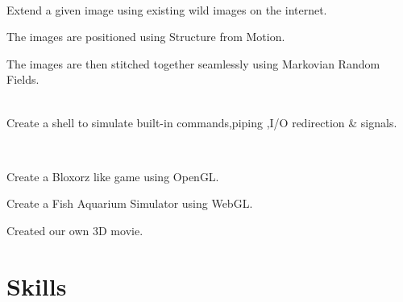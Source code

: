 \documentclass[]{resume-openfont}
\begin{document}
\\
\begin{tightemize}
    \item Extend a given image using existing wild images on the internet.
    \item The images are positioned using Structure from Motion.
    \item The images are then stitched together seamlessly using Markovian Random Fields.
\end{tightemize}
 
\sectionsep

\\

Create a shell to simulate built-in commands,piping ,I/O redirection \& signals.
\sectionsep

\\
\begin{tightemize}
    \item Create a Bloxorz like game using OpenGL.
    \item Create a Fish Aquarium Simulator using WebGL.
    \item Created our own 3D movie.
\end{tightemize}
\sectionsep


\section{Skills}
\begin{resumeSkillList}
    \\
    \\
\end{resumeSkillList}

\end{document}

